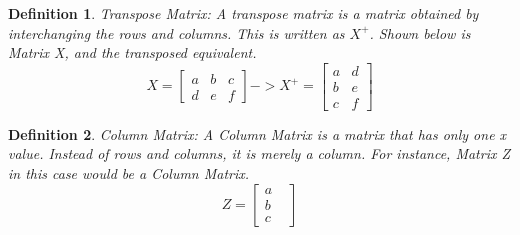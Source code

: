 \documentclass[final,1p,12pt]{elsarticle}
\newtheorem{definition}{Definition}
\begin{document}
        \begin{definition}Transpose Matrix: 
            A transpose matrix is a matrix obtained by interchanging the rows and columns. This is written as $X^{+}$. Shown below is Matrix X, and the transposed equivalent.
            \begin{equation}
                X =
                \begin{bmatrix}
                    a & b & c \\
                    d & e & f
                \end{bmatrix}
                -> X^{+} =
                \begin{bmatrix}
                    a & d \\
                    b & e \\
                    c & f
                \end{bmatrix}
            \end{equation}
        \end{definition}
        
        \begin{definition}Column Matrix:
        A Column Matrix is a matrix that has only one x value. Instead of rows and columns, it is merely a column. For instance, Matrix Z in this case would be a Column Matrix.
        \begin{equation}%
            Z =
            \begin{bmatrix}
                a&\\
                b&\\
                c
            \end{bmatrix}
        \end{equation}
        \end{definition}
        

\clearpage\appendix



\end{document}
